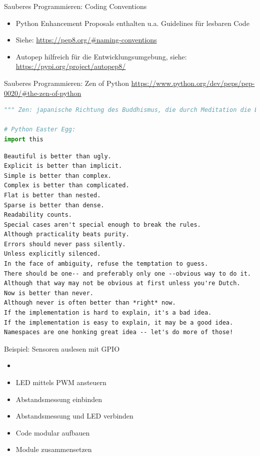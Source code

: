 \begin{frame}[fragile]{Sauberes Programmieren: Coding Conventions}
    \begin{itemize}
        \item Python Enhancement Proposals enthalten u.a. Guidelines für lesbaren Code
        \item Siehe: \url{https://pep8.org/#naming-conventions}
        \item Autopep hilfreich für die Entwicklungsumgebung, siehe:  \url{https://pypi.org/project/autopep8/}
     \end{itemize}
\end{frame}



\begin{frame}[fragile]{Sauberes Programmieren: Zen of Python}
\url{https://www.python.org/dev/peps/pep-0020/#the-zen-of-python} 
\begin{lstlisting}[language=Python]
""" Zen: japanische Richtung des Buddhismus, die durch Meditation die Erfahrung der Einheit allen Seins und damit tätige Lebenskraft und größte Selbstbeherrschung zu erreichen sucht. """

# Python Easter Egg:
import this
\end{lstlisting}
\begin{lstlisting}	
Beautiful is better than ugly.
Explicit is better than implicit.
Simple is better than complex.
Complex is better than complicated.
Flat is better than nested.
Sparse is better than dense.
Readability counts.
Special cases aren't special enough to break the rules.
Although practicality beats purity.
Errors should never pass silently.
Unless explicitly silenced.
In the face of ambiguity, refuse the temptation to guess.
There should be one-- and preferably only one --obvious way to do it.
Although that way may not be obvious at first unless you're Dutch.
Now is better than never.
Although never is often better than *right* now.
If the implementation is hard to explain, it's a bad idea.
If the implementation is easy to explain, it may be a good idea.
Namespaces are one honking great idea -- let's do more of those!
\end{lstlisting}
\end{frame}


\begin{frame}{Beispiel: Sensoren auslesen mit GPIO}
    \begin{itemize}
    \setlength{\itemindent}{.4in}
     \item [\textbf{ Ziele}]
    \end{itemize}
    \begin{itemize}
        \item  LED mittels PWM ansteuern
        \item  Abstandsmessung einbinden
        \item  Abstandsmessung und LED verbinden
        \item  Code modular aufbauen
        \item  Module zusammensetzen 
     \end{itemize}
\end{frame}



